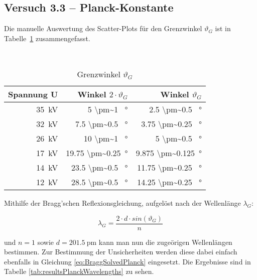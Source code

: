 \subsection{Versuch 3.3 -- Planck-Konstante}
\label{subsec:planck}

Die manuelle Auswertung des Scatter-Plots f\"ur den Grenzwinkel $\vartheta_G$ ist in
Tabelle~\ref{tab:resultsPlanckManualFit} zusammengefasst.

\begin{table}[h!]
    \centering
    \small
    \caption{Grenzwinkel $\vartheta_G$}~\label{tab:resultsPlanckManualFit}
    \begin{tabular}{rrr}
        \toprule
        Spannung U          & Winkel $2 \cdot \vartheta_G$    & Winkel $\vartheta_G$             \\
        \midrule
        \SI{35}{\kilo\volt} &       \SI{5     \pm~1   }{\degree} & \SI{2.5   \pm~0.5  }{\degree} \\
        \SI{32}{\kilo\volt} &       \SI{7.5   \pm~0.5 }{\degree} & \SI{3.75  \pm~0.25 }{\degree} \\
        \SI{26}{\kilo\volt} &       \SI{10    \pm~1   }{\degree} & \SI{5     \pm~0.5  }{\degree} \\
        \SI{17}{\kilo\volt} &       \SI{19.75 \pm~0.25}{\degree} & \SI{9.875 \pm~0.125}{\degree} \\
        \SI{14}{\kilo\volt} &       \SI{23.5  \pm~0.5 }{\degree} & \SI{11.75 \pm~0.25 }{\degree} \\
        \SI{12}{\kilo\volt} &       \SI{28.5  \pm~0.5 }{\degree} & \SI{14.25 \pm~0.25 }{\degree} \\
        \bottomrule
    \end{tabular}
\end{table}

Mithilfe der Bragg'schen Reflexionsgleichung, aufgel\"ost nach der Wellenl\"ange $\lambda_G$:

\begin{equation}
    \label{eq:BraggSolvedPlanck}
    \lambda_G = \frac{2 \cdot d \cdot sin(\vartheta_G)}{n}
\end{equation}

und $n = 1$ sowie $d  = \SI{201.5}{\pico\meter}$ kann man nun die zuge\"origen
Wellenl\"angen bestimmen. Zur Bestimmung der Unsicherheiten werden diese dabei
einfach ebenfalls in Gleichung \ref{eq:BraggSolvedPlanck} eingesetzt. Die Ergebnisse
sind in Tabelle \ref{tab:resultsPlanckWavelengths} zu sehen.

